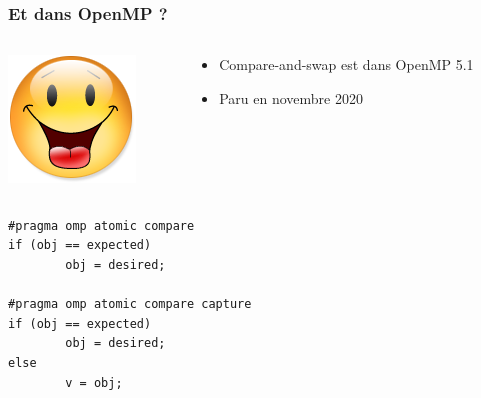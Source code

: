 \documentclass[xcolor={x11names,svgnames},x11names,svgnames]{beamer}
\begin{document}

\begin{frame}[fragile]
  \frametitle{Et dans OpenMP ?}

  \begin{columns}[b]
    \begin{column}{.1\textwidth}
      \includegraphics[width=\textwidth]{Content.png}
    \end{column}
    \begin{column}{.9\textwidth}
      \begin{itemize}
      \item Compare-and-swap est dans OpenMP 5.1
      \item Paru en novembre 2020
      \end{itemize}
    \end{column}
  \end{columns}

\bigskip
  
\begin{verbatim}
#pragma omp atomic compare
if (obj == expected)
        obj = desired;

#pragma omp atomic compare capture
if (obj == expected)
        obj = desired;
else
        v = obj;
\end{verbatim} 


\end{frame}
\end{document}
